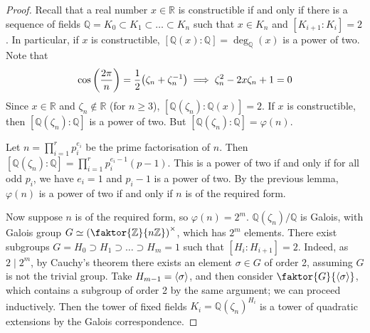 \begin{proof}
	Recall that a real number \( x \in \mathbb R \) is constructible if and only if there is a sequence of fields \( \mathbb Q = K_0 \subset K_1 \subset \dots \subset K_n \) such that \( x \in K_n \) and \( [K_{i+1} : K_i] = 2 \).
	In particular, if \( x \) is constructible, \( [\mathbb Q(x) : \mathbb Q] = \deg_{\mathbb Q}(x) \) is a power of two.
	Note that
	\[ \cos\qty(\frac{2\pi}{n}) = \frac{1}{2} \qty(\zeta_n + \zeta_n^{-1}) \implies \zeta_n^2 - 2x\zeta_n + 1 = 0 \]
	Since \( x \in \mathbb R \) and \( \zeta_n \not\in \mathbb R \) (for \( n \geq 3 \)), \( [\mathbb Q(\zeta_n) : \mathbb Q(x)] = 2 \).
	If \( x \) is constructible, then \( [\mathbb Q(\zeta_n):\mathbb Q] \) is a power of two.
	But \( [\mathbb Q(\zeta_n):\mathbb Q] = \varphi(n) \).

	Let \( n = \prod_{i=1}^r p_i^{e_i} \) be the prime factorisation of \( n \).
	Then \( [\mathbb Q(\zeta_n):\mathbb Q] = \prod_{i=1}^r p_i^{e_i - 1}(p-1) \).
	This is a power of two if and only if for all odd \( p_i \), we have \( e_i = 1 \) and \( p_i - 1 \) is a power of two.
	By the previous lemma, \( \varphi(n) \) is a power of two if and only if \( n \) is of the required form.

	Now suppose \( n \) is of the required form, so \( \varphi(n) = 2^m \).
	\( \mathbb Q(\zeta_n) / \mathbb Q \) is Galois, with Galois group \( G \simeq \qty(\faktor{\mathbb Z}{n\mathbb Z})^\times \), which has \( 2^m \) elements.
	There exist subgroups \( G = H_0 \supset H_1 \supset \dots \supset H_m = 1 \) such that \( [H_i : H_{i+1}] = 2 \).
	Indeed, as \( 2 \mid 2^m \), by Cauchy's theorem there exists an element \( \sigma \in G \) of order 2, assuming \( G \) is not the trivial group.
	Take \( H_{m-1} = \left\langle{} \sigma \right\rangle \), and then consider \( \faktor{G}{\genset{\sigma}} \), which contains a subgroup of order 2 by the same argument; we can proceed inductively.
	Then the tower of fixed fields \( K_i = \mathbb Q(\zeta_n)^{H_i} \) is a tower of quadratic extensions by the Galois correspondence.
\end{proof}

